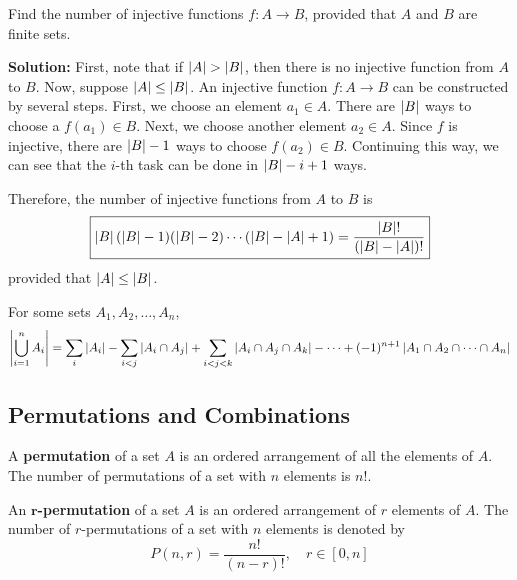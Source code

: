 \begin{example}
    Find the number of injective functions $f:A\to B$, provided that $A$ and $B$ are finite sets.

    \textbf{Solution:}
    First, note that if $\left|A\right| > \left|B\right|$, then there is no injective function from $A$ to $B$.
    Now, suppose $\left|A\right| \leq \left|B\right|$. An injective function $f:A\to B$ can be constructed by
    several steps. First, we choose an element $a_1\in A$. There are $\left|B\right|$ ways to choose
    a $f(a_1)\in B$. Next, we choose another element $a_2\in A$. Since $f$ is injective,
    there are $\left|B\right|-1$ ways to choose $f(a_2)\in B$. Continuing this way, we can see that
    the $i$-th task can be done in $\left|B\right|-i+1$ ways.

    Therefore, the number of injective functions from $A$ to $B$ is
    \[
        \boxed{\left|B\right|(\left|B\right|-1)(\left|B\right|-2)\cdots(\left|B\right|-\left|A\right|+1) = \frac{\left|B\right|!}{(\left|B\right|-\left|A\right|)!}}
    \]
    provided that $\left|A\right| \leq \left|B\right|$.
\end{example}

\begin{theorem}
    For some sets $A_1, A_2, \ldots, A_n$,
    \[
        \left|\bigcup_{i=1}^n A_i\right|
        = \sum_{i} \left|A_i\right|
        - \sum_{i<j} \left|A_i \cap A_j\right|
        + \sum_{i<j<k} \left|A_i \cap A_j \cap A_k\right|
        - \cdots
        + (-1)^{n+1} \left|A_1 \cap A_2 \cap \cdots \cap A_n\right|
    \]
\end{theorem}

\subsection{Permutations and Combinations}

\begin{definition}[Permutation]
    A \textbf{permutation} of a set $A$ is an ordered arrangement of all the elements of $A$.
    The number of permutations of a set with $n$ elements is $n!$.
\end{definition}

\begin{definition}[$r$-Permutation]
    An \textbf{$\bm{r}$-permutation} of a set $A$ is an ordered arrangement of $r$ elements of $A$.
    The number of $r$-permutations of a set with $n$ elements is denoted by
    \[
        P(n,r) = \frac{n!}{(n-r)!},\quad r\in[0,n]
    \]
\end{definition}

